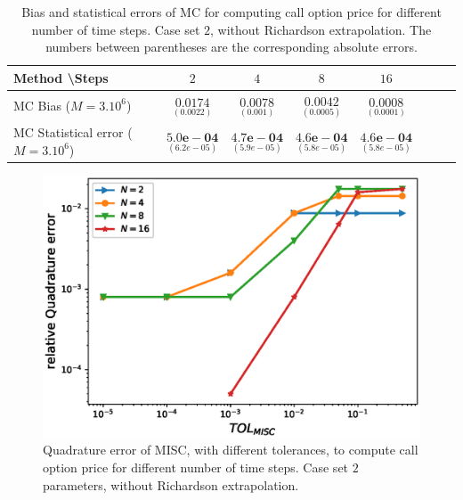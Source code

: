 \FloatBarrier

\begin{table}[h!]
	\centering
	\begin{tabular}{l*{6}{c}r}
		Method \textbackslash  Steps            & $2$ & $4$ & $8$ & $16$  \\
		\hline
		MC Bias ($M=3.10^6$)   & 	$ \underset{(    0.0022)}{\mathbf{0.0174}}$  & $\underset{(0.001)}{\mathbf{0.0078}}$  & $\underset{(0.0005)}{\mathbf{0.0042}}$ & $\underset{(0.0001)}{\mathbf{0.0008}}$\\ 
		
		MC Statistical error ($M=3.10^6$)  &  $\underset{(   6.2e-05)} {\mathbf{5.0e-04}}$  & $\underset{(5.9e-05)} {\mathbf{4.7e-04}}$  & $\underset{(5.8e-05)} {\mathbf{4.6e-04 }}$ & $\underset{(5.8e-05)} {\mathbf{4.6e-04 }}$	\\
		
		\hline
	\end{tabular}
	\caption{Bias and statistical errors of MC   for computing call option price  for different number of time steps. Case set $2$, without Richardson extrapolation. The numbers between parentheses are the corresponding absolute errors.}
	\label{Bias and Statistical errors of MC ($M=10^6$)  for computing Call option price  for different number of time steps. Case set 3, without Richardson extrapolation. The numbers between parentheses are the corresponding absolute errors.}
\end{table}




\FloatBarrier

	\begin{figure}[h!]
		\centering
		\includegraphics[width=0.35\linewidth]{./figures/rBergomi_MISC_quadratre_error/vs_TOL/set5/relative_quad_error_wrt_MISC_TOL_set5_non_rich}
	
	
	\caption{Quadrature error of MISC, with different tolerances, to compute call option price  for different number of time steps. Case  set $2$ parameters, without Richardson extrapolation. }
	\label{fig:Quadrature_error_set3}
\end{figure}

